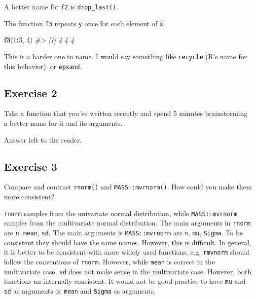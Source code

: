 \documentclass[]{book}
\newenvironment{Shaded}{\begin{snugshade}}{\end{snugshade}}
\newcommand{\CommentTok}[1]{\textcolor[rgb]{0.56,0.35,0.01}{\textit{#1}}}
\newcommand{\DecValTok}[1]{\textcolor[rgb]{0.00,0.00,0.81}{#1}}
\newcommand{\KeywordTok}[1]{\textcolor[rgb]{0.13,0.29,0.53}{\textbf{#1}}}
\newcommand{\NormalTok}[1]{#1}
\newcommand{\OperatorTok}[1]{\textcolor[rgb]{0.81,0.36,0.00}{\textbf{#1}}}
\theoremstyle{plain}
\theoremstyle{remark}
\theoremstyle{definition}
\theoremstyle{definition}
\theoremstyle{definition}
\theoremstyle{remark}
\begin{document}
A better name for \texttt{f2} is \texttt{drop\_last()}.

The function \texttt{f3} repeats \texttt{y} once for each element of
\texttt{x}.

\begin{Shaded}
\begin{Highlighting}[]
\KeywordTok{f3}\NormalTok{(}\DecValTok{1}\OperatorTok{:}\DecValTok{3}\NormalTok{, }\DecValTok{4}\NormalTok{)}
\CommentTok{#> [1] 4 4 4}
\end{Highlighting}
\end{Shaded}

This is a harder one to name. I would say something like
\texttt{recycle} (R's name for this behavior), or \texttt{epxand}.

\hypertarget{exercise-2-48}{%
\subsection{Exercise 2}\label{exercise-2-48}}

Take a function that you've written recently and spend 5 minutes
brainstorming a better name for it and its arguments.

Answer left to the reader.

\hypertarget{exercise-3-38}{%
\subsection{Exercise 3}\label{exercise-3-38}}

Compare and contrast \texttt{rnorm()} and \texttt{MASS::mvrnorm()}. How
could you make them more consistent?

\texttt{rnorm} samples from the univariate normal distribution, while
\texttt{MASS::mvrnorm} samples from the multivariate normal
distribution. The main arguments in \texttt{rnorm} are \texttt{n},
\texttt{mean}, \texttt{sd}. The main arguments is \texttt{MASS::mvrnorm}
are \texttt{n}, \texttt{mu}, \texttt{Sigma}. To be consistent they
should have the same names. However, this is difficult. In general, it
is better to be consistent with more widely used functions, e.g.
\texttt{rmvnorm} should follow the conventions of \texttt{rnorm}.
However, while \texttt{mean} is correct in the multivariate case,
\texttt{sd} does not make sense in the multivariate case. However, both
functions an internally consistent. It would not be good practice to
have \texttt{mu} and \texttt{sd} as arguments or \texttt{mean} and
\texttt{Sigma} as arguments.
\end{document}
